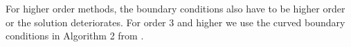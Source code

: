 



For higher order methods, the boundary conditions also have to be higher
order or the solution deteriorates. For order 3 and higher we use
the curved boundary conditions in Algorithm 2 from \cite{kb:2006}.


